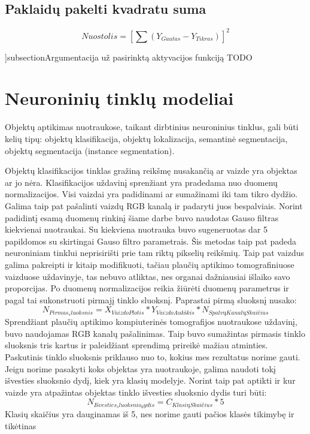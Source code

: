 \documentclass{VUMIFInfKursinis}
\begin{document}
\subsection{Paklaidų pakelti kvadratu suma}
\[
  Nuostolis = [\sum(Y_{Gautas} - Y_{Tikras})]^{2}
\]

]subsection{Argumentacija už pasirinktą aktyvacijos funkciją}
TODO
\section{Neuroninių tinklų modeliai}
\par
Objektų aptikimas nuotraukose, taikant dirbtinius neuroninius tinklus, gali būti kelių
tipų: objektų klasifikacija, objektų lokalizacija, semantinė segmentacija,
objektų segmentacija (instance segmentation).
 \par
 Objektų klasifikacijos tinklas gražiną reikšmę nusakančią ar vaizde yra objektas
 ar jo nėra. Klasifikacijos uždavinį sprenžiant yra pradedama nuo duomenų normalizacijos.
 Visi vaizdai yra padidinami ar sumažinami iki tam tikro dydžio. Galima taip pat pašalinti
 vaizdų RGB kanalą ir padaryti juos bespalviais. Norint padidintį esamą duomenų rinkinį šiame
 darbe buvo naudotas Gauso filtras kiekvienai nuotraukai. Su kiekviena nuotrauka buvo sugeneruotas dar
 5 papildomos su skirtingai Gauso filtro parametrais. Šis metodas taip pat padeda neuroniniam
 tinklui neprisirišti prie tam riktų pikselių reikšmių. Taip pat vaizdus galima pakreipti ir kitaip
 modifikuoti, tačiau plaučių aptikimo tomografiniuose vaizduose uždavinyje, tas nebuvo
 atliktas, nes organai dažniausiai išlaiko savo proporcijas. Po duomenų normalizacijos reikia
 žiūrėti duomenų parametrus ir pagal tai sukonstruoti pirmajį tinklo sluoksnį. Paprastai pirmą sluoksnį
 nusako:
 \[
N_{Pirmas_sluoksnis} = X_{VaizdoPlotis} * Y_{VaizdoAukškis} * N_{SpalvųKanalųSkaičius}
 \]
Sprendžiant plaučių aptikimo kompiuterinės tomografijos nuotraukose uždavinį, buvo naudojamas
RGB kanalų pašalinimas. Taip buvo sumažintas pirmasis tinklo sluoksnis tris kartus ir paleidžiant
sprendimą prireikė mažiau atminties. Paskutinis tinklo sluoksnis priklauso nuo to, kokius mes
rezultatus norime gauti. Jeigu norime pasakyti koks objektas yra nuotraukoje, galima naudoti
tokį išvesties sluoksnio dydį, kiek yra klasių modelyje. Norint taip pat aptikti ir kur
vaizde yra atpažintas objektas tinklo išvesties sluoksnio dydis turi būti:
\[
  N_{Išvesties_sluoksnio_dydis} = C_{KlasiųSkaičius}*5
\]
Klasių skaičius yra dauginamas iš 5, nes norime gauti pačios klasės tikimybę ir tikėtinas
\end{document}
